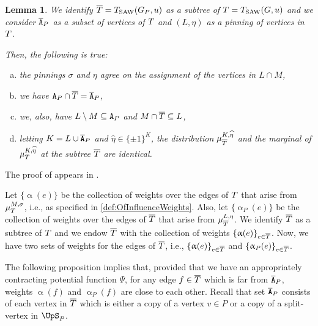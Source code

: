 \documentclass[11pt,reqno]{amsart}
\numberwithin{equation}{section}
\newtheorem{lemma}[theorem]{Lemma}
\newcommand{\blue}[1]{{\color{blue}#1}}
\newcommand{\bluepigment}[1]{{\color{blue(pigment)}#1}}
\newcommand{\cadmiumorange}[1]{{\color{cadmiumorange}#1}}
\newcommand{\deeppink}[1]{{\color{deeppink}#1}}
\newcommand{\electricviolet}[1]{{\color{electricviolet}#1}}
\newcommand{\goldenbrown}[1]{{\color{goldenbrown}#1}}
\newcommand{\red}[1]{{\color{red}#1}}
\newcommand{\potF}{{\Psi}}
\newcommand{\Tsaw}{T_{\rm SAW}}
\renewcommand{\blue}[1]{#1}
\renewcommand{\bluepigment}[1]{#1}
\renewcommand{\cadmiumorange}[1]{#1}
\renewcommand{\deeppink}[1]{#1}
\renewcommand{\electricviolet}[1]{#1}
\renewcommand{\goldenbrown}[1]{#1}
\renewcommand{\red}[1]{#1}
\newcommand{\ke}{\blue{e}}
\newcommand{\kf}{\deeppink{f}}
\newcommand{\kK}{\bluepigment{K}}
\newcommand{\kL}{\cadmiumorange{L}}
\newcommand{\kP}{\goldenbrown{P}}
\newcommand{\ku}{\red{u}}
\newcommand{\kv}{\electricviolet{v}}
\renewcommand{\ke}{e}
\renewcommand{\kf}{f}
\renewcommand{\kK}{K}
\renewcommand{\kL}{L}
\renewcommand{\kP}{P}
\renewcommand{\ku}{u}
\renewcommand{\kv}{v}
\newcommand{\infweight}{\upalpha}
\begin{document}
\begin{lemma}\label{lemma:BoundaryTVsBoundaryTPFromU}
We identify $\SMTPu=\Tsaw(\gext{G}{\kP},\ku)$ as a subtree of $\SMTu=\Tsaw(G,\ku)$ and we consider $\cpTP$ as a subset of vertices of $T$
and 
$(\kL, \eta)$   as a pinning of vertices in $T$. 

Then, the following is true:
\begin{enumerate}[(a)]
\item the pinnings $\sigma$ and $\eta$ agree on the assignment of the vertices in $\kL\cap M$, \label{statement:lemma:BoundaryTVsBoundaryTPFromUA}
\item we have $\cpT \cap \SMTPu= \cpTP$, \label{stat:B-lemma:BoundaryTVsBoundaryTPFromU} \label{statement:lemma:BoundaryTVsBoundaryTPFromUB}
\item we, also, have $\kL\setminus M \subseteq \cpT$ and $M\cap \SMTPu \subseteq \kL$, \label{stat:C-lemma:BoundaryTVsBoundaryTPFromU}
\item letting $\kK=\kL\cup \cpTP$ and $\widehat{\eta}\in \{\pm 1\}^{\kK}$, the distribution 
$\mu^{\kK, \widehat{\eta}}_{\SMTPu}$ and the marginal of $\mu^{\kK, \widehat{\eta}}_{\SMTu}$ at the subtree $\overline{T}$ are identical. 
\label{statement:lemma:BoundaryTVsBoundaryTPFromUD}
\end{enumerate}
% 
\end{lemma}
The proof of  appears in . 
%





Let $\{\infweight(\ke)\}$ be the collection of weights over the edges of $T$ that arise from $\mu^{M,\sigma}_{T}$, i.e., 
as specified in \eqref{def:OfInfluenceWeights}.
Also, let $\{\infweight_{\kP}(\ke)\}$ be the collection of weights over the edges of $\overline{T}$ that arise from $\mu^{\kL,\eta}_{\SMTPu}$.
We identify $\overline{T}$ as a subtree of $T$ and we endow $\overline{T}$ with the collection of weights $\{\infweight(\ke)\}_{\ke\in \SMTPu}$. 
 Now, we have two sets of weights for the edges of $\overline{T}$, i.e., $\{\infweight(\ke)\}_{\ke\in \SMTPu}$ and $\{\infweight_{\kP}(\ke)\}_{\ke\in \SMTPu}$. 



The following proposition implies that, provided that we have an appropriately contracting potential function $\potF$, 
 for any edge $\kf\in \SMTPu$ which is far from $\cpTP$, weights $\infweight(\kf)$ and $\infweight_{\kP}(\kf)$ are 
 close to each other. Recall that set $\cpTP$ consists of each vertex in $\overline{T}$ which is either a copy of a vertex 
 $\kv\in \kP$ or  a copy of a split-vertex in  $\ssplit_{\kP}$. 
\end{document}
